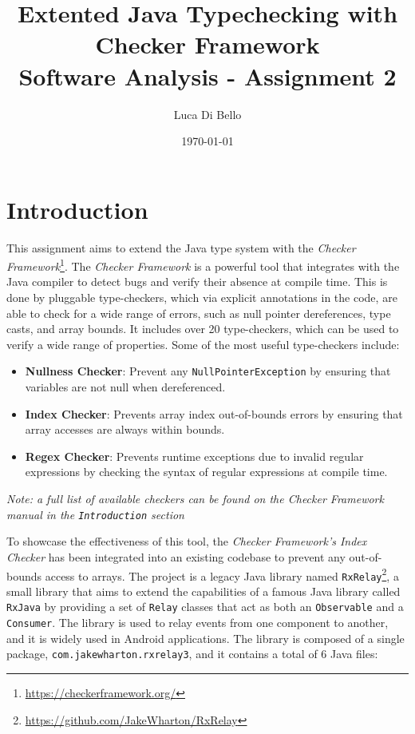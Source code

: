 \documentclass[a4paper, 11pt]{article}
\title{Extented Java Typechecking with Checker Framework \\[1ex] \large Software Analysis - Assignment 2}
\author{Luca Di Bello}
\date{\today}
\begin{document}
\maketitle
\tableofcontents

\section{Introduction}

This assignment aims to extend the Java type system with the \textit{Checker Framework}\footnote{\url{https://checkerframework.org/}}. The \textit{Checker Framework} is a powerful tool that integrates with the Java compiler to detect bugs and verify their absence at compile time. This is done by pluggable type-checkers, which via explicit annotations in the code, are able to check for a wide range of errors, such as null pointer dereferences, type casts, and array bounds.  It includes over 20 type-checkers, which can be used to verify a wide range of properties. Some of the most useful type-checkers include:

\begin{itemize}
	\item \textbf{Nullness Checker}: Prevent any \texttt{NullPointerException} by ensuring that variables are not null when dereferenced.
	\item \textbf{Index Checker}: Prevents array index out-of-bounds errors by ensuring that array accesses are always within bounds.
	\item \textbf{Regex Checker}: Prevents runtime exceptions due to invalid regular expressions by checking the syntax of regular expressions at compile time.
\end{itemize}

\textit{Note: a full list of available checkers can be found on the Checker Framework manual in the \texttt{Introduction} section \cite{checkerframework:manual}}

\pagebreak

\noindent To showcase the effectiveness of this tool, the \textit{Checker Framework's Index Checker} has been integrated into an existing codebase to prevent any out-of-bounds access to arrays. The project is a legacy Java library named \texttt{RxRelay}\footnote{\url{https://github.com/JakeWharton/RxRelay}}, a small library that aims to extend the capabilities of a famous Java library called \texttt{RxJava} by providing a set of \texttt{Relay} classes that act as both an \texttt{Observable} and a \texttt{Consumer}. The library is used to relay events from one component to another, and it is widely used in Android applications. \cite{rxrelay:readme} The library is composed of a single package, \texttt{com.jakewharton.rxrelay3}, and it contains a total of 6 Java files:
\end{document}
